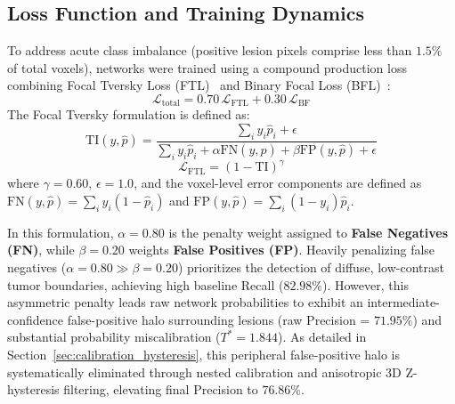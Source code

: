 \documentclass[preprint,3p,times,onecolumn]{elsarticle}
\begin{document}
\subsection{Loss Function and Training Dynamics}
To address acute class imbalance (positive lesion pixels comprise less than $1.5\%$ of total voxels), networks were trained using a compound production loss combining Focal Tversky Loss (FTL)~\cite{abraham2019novel} and Binary Focal Loss (BFL)~\cite{lin2017focal}:
\begin{equation}
\mathcal{L}_{\text{total}} = 0.70\,\mathcal{L}_{\text{FTL}} + 0.30\,\mathcal{L}_{\text{BF}}
\end{equation}
The Focal Tversky formulation is defined as:
\begin{equation}
\text{TI}(y, \hat{p}) = \frac{\sum_i y_i \hat{p}_i + \epsilon}{\sum_i y_i \hat{p}_i + \alpha \text{FN}(y, \hat{p}) + \beta \text{FP}(y, \hat{p}) + \epsilon}
\end{equation}
\begin{equation}
\mathcal{L}_{\text{FTL}} = (1 - \text{TI})^\gamma
\end{equation}
where $\gamma = 0.60$, $\epsilon = 1.0$, and the voxel-level error components are defined as $\text{FN}(y, \hat{p}) = \sum_i y_i(1 - \hat{p}_i)$ and $\text{FP}(y, \hat{p}) = \sum_i (1 - y_i)\hat{p}_i$.

In this formulation, $\alpha = 0.80$ is the penalty weight assigned to \textbf{False Negatives (FN)}, while $\beta = 0.20$ weights \textbf{False Positives (FP)}. Heavily penalizing false negatives ($\alpha = 0.80 \gg \beta = 0.20$) prioritizes the detection of diffuse, low-contrast tumor boundaries, achieving high baseline Recall ($82.98\%$). However, this asymmetric penalty leads raw network probabilities to exhibit an intermediate-confidence false-positive halo surrounding lesions (raw Precision = $71.95\%$) and substantial probability miscalibration ($T^* = 1.844$). As detailed in Section~\ref{sec:calibration_hysteresis}, this peripheral false-positive halo is systematically eliminated through nested calibration and anisotropic 3D Z-hysteresis filtering, elevating final Precision to $76.86\%$.
\end{document}
